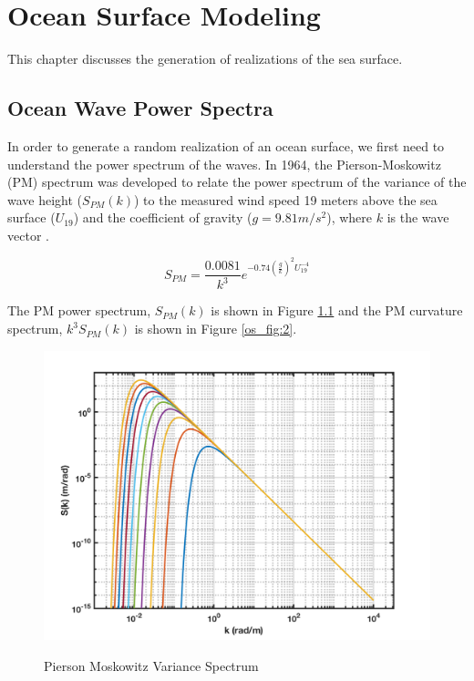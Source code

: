 \chapter{Ocean Surface Modeling}
This chapter discusses the generation of realizations of the sea surface.

\section{Ocean Wave Power Spectra}  \label{os_sec:power_spectra}
In order to generate a random realization of an ocean surface, we first need to understand the power spectrum of the waves. In 1964, the Pierson-Moskowitz (PM) spectrum was developed to relate the power spectrum of the variance of the wave height ($S_{PM}(k)$) to the measured wind speed 19 meters above the sea surface ($U_{19}$) and the coefficient of gravity ($g=9.81 m/s^2$), where $k$ is the wave vector \cite{michel_sea_spectra}.

 \begin{equation}
S_{PM} = \frac{0.0081}{k^3}e^{-0.74\left(\frac{g}{k}\right)^2U_{19}^{-4}}
\label{os_eq:1}
\end{equation}
 \renewcommand{\baselinestretch}{2} \small\normalsize

 The PM power spectrum, $S_{PM}(k)$ is shown in Figure \ref{os_fig:1} and the PM curvature spectrum, $k^3S_{PM}(k)$ is shown in Figure \ref{os_fig:2}. 

 \begin{figure}[H]
  \begin{center}
\includegraphics[width=5in]{../media/PM_variance_spectrum.png}
  \end{center}
  \renewcommand{\baselinestretch}{1} \small\normalsize
  \begin{quote}
    \caption[Pierson Moskowitz Variance Spectrum]{Pierson Moskowitz Variance Spectrum\label{os_fig:1}}
  \end{quote}
\end{figure}
\renewcommand{\baselinestretch}{2} \small\normalsize

